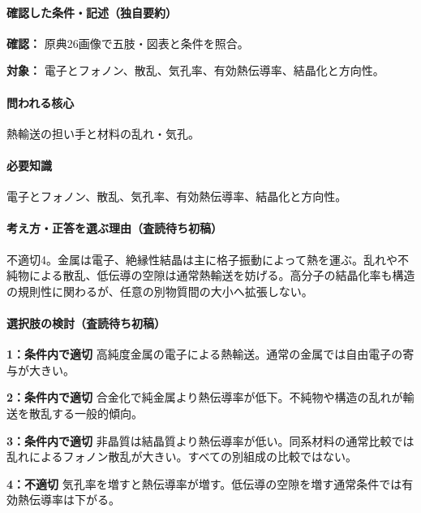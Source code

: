 \paragraph{確認した条件・記述（独自要約）}\mbox{}\par

\noindent\textbf{確認：} 原典26画像で五肢・図表と条件を照合。\par

\noindent\textbf{対象：} 電子とフォノン、散乱、気孔率、有効熱伝導率、結晶化と方向性。\par

\paragraph{問われる核心} 熱輸送の担い手と材料の乱れ・気孔。

\paragraph{必要知識} 電子とフォノン、散乱、気孔率、有効熱伝導率、結晶化と方向性。

\paragraph{考え方・正答を選ぶ理由（査読待ち初稿）} 不適切4。金属は電子、絶縁性結晶は主に格子振動によって熱を運ぶ。乱れや不純物による散乱、低伝導の空隙は通常熱輸送を妨げる。高分子の結晶化率も構造の規則性に関わるが、任意の別物質間の大小へ拡張しない。

\paragraph{選択肢の検討（査読待ち初稿）}\mbox{}\par

\noindent\textbf{1：条件内で適切} 高純度金属の電子による熱輸送。通常の金属では自由電子の寄与が大きい。\par

\noindent\textbf{2：条件内で適切} 合金化で純金属より熱伝導率が低下。不純物や構造の乱れが輸送を散乱する一般的傾向。\par

\noindent\textbf{3：条件内で適切} 非晶質は結晶質より熱伝導率が低い。同系材料の通常比較では乱れによるフォノン散乱が大きい。すべての別組成の比較ではない。\par

\noindent\textbf{4：不適切} 気孔率を増すと熱伝導率が増す。低伝導の空隙を増す通常条件では有効熱伝導率は下がる。\par

